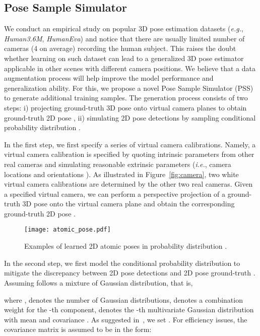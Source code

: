 \documentclass[letterpaper]{article} \usepackage{aaai18}  \usepackage{times}  \usepackage{helvet}  \usepackage{courier}  \usepackage{url}  \usepackage{color}
\begin{document}
\subsection{Pose Sample Simulator}

We conduct an empirical study on popular 3D pose estimation datasets (\textit{e.g.},
\textit{Human3.6M}, \textit{HumanEva}) and notice that there are usually limited number of cameras (4 on average) recording the human subject. This raises the doubt whether learning on such dataset can lead to a generalized 3D pose estimator applicable in other scenes with different camera positions. We believe that a data augmentation process will help improve the model performance and generalization ability. For this, we propose a novel Pose Sample Simulator (PSS) to generate additional training samples. The generation process consists of two steps: i) projecting ground-truth 3D pose  onto virtual camera planes to obtain ground-truth 2D pose , ii) simulating 2D pose detections  by sampling conditional probability distribution .

In the first step, we first specify a series of virtual camera calibrations. Namely, a virtual camera calibration is specified by quoting intrinsic parameters  from other real cameras and simulating reasonable extrinsic parameters (\textit{i.e.}, camera locations  and orientations ). As illustrated in Figure~\ref{fig:camera}, two white virtual camera calibrations are determined by the other two real cameras. Given a specified virtual camera, we can perform a perspective projection of a ground-truth 3D pose  onto the virtual camera plane and obtain the corresponding ground-truth 2D pose .

\begin{figure}[ptb]
\centering
\texttt{[image: atomic\_pose.pdf]}
\caption{Examples of learned 2D atomic poses in probability distribution .}
\label{fig:gmm}
\end{figure}

In the second step, we first model the conditional probability distribution  to mitigate the discrepancy between 2D pose detections  and 2D pose ground-truth . Assuming  follows a mixture of Gaussian distribution, that is,

where ,  denotes the number of Gaussian distributions,  denotes a combination weight for the -th component,  denotes the -th multivariate Gaussian distribution with mean  and covariance . As suggested in~\cite{andriluka20142d}, we set . For efficiency issues, the covariance matrix  is assumed to be in the form:
\end{document}
